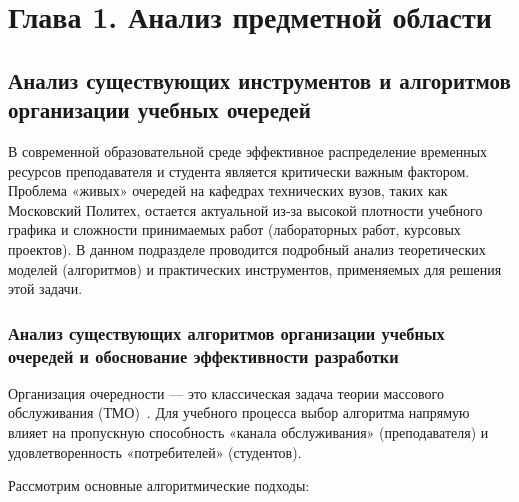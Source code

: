 \section*{Глава 1. Анализ предметной области}

\subsection{Анализ существующих инструментов и алгоритмов организации учебных очередей}

В современной образовательной среде эффективное распределение временных ресурсов преподавателя и 
студента является критически важным фактором. Проблема «живых» очередей на кафедрах технических вузов, 
таких как Московский Политех, остается актуальной из-за высокой плотности учебного графика и сложности принимаемых работ 
(лабораторных работ, курсовых проектов). В данном подразделе проводится подробный анализ теоретических моделей (алгоритмов)
 и практических инструментов, применяемых для решения этой задачи.

\subsubsection{Анализ существующих алгоритмов организации учебных очередей и обоснование эффективности разработки}

Организация очередности — это классическая задача теории массового обслуживания (ТМО)~\cite{kleinrock_queueing}.
Для учебного процесса выбор алгоритма напрямую влияет на пропускную способность «канала обслуживания»
(преподавателя) и удовлетворенность «потребителей» (студентов).

Рассмотрим основные алгоритмические подходы:

